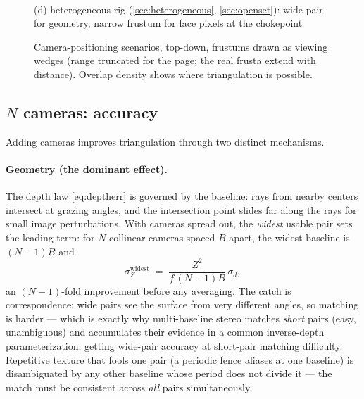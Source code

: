 \documentclass[11pt]{article}
\theoremstyle{definition}
\begin{document}
\begin{figure}[ht]
\begin{minipage}[t]{0.48\textwidth}
\\[2pt]
(d) heterogeneous rig (\autoref{sec:heterogeneous},
\autoref{sec:openset}): wide pair for geometry, narrow frustum for
face pixels at the chokepoint
\end{minipage}
\caption{Camera-positioning scenarios, top-down, frustums drawn as
viewing wedges (range truncated for the page; the real frusta extend
with distance). Overlap density shows where triangulation is possible.}
\label{fig:rigs}
\end{figure}

\subsection{$N$ cameras: accuracy}
\label{sec:ncams}

Adding cameras improves triangulation through two distinct mechanisms.

\paragraph{Geometry (the dominant effect).} The depth law
\eqref{eq:deptherr} is governed by the baseline: rays from nearby centers
intersect at grazing angles, and the intersection point slides far along
the rays for small image perturbations. With cameras spread out, the
\emph{widest} usable pair sets the leading term: for $N$ collinear cameras
spaced $B$ apart, the widest baseline is $(N{-}1)B$ and
\begin{equation}
\sigma_Z^{\text{widest}} \;=\; \frac{Z^2}{f\,(N{-}1)B}\,\sigma_d,
\label{eq:multibaseline}
\end{equation}
an $(N{-}1)$-fold improvement before any averaging. The catch is
correspondence: wide pairs see the surface from very different angles, so
matching is harder --- which is exactly why multi-baseline stereo
\cite{OkutomiKanade1993} matches \emph{short} pairs (easy, unambiguous) and
accumulates their evidence in a common inverse-depth parameterization,
getting wide-pair accuracy at short-pair matching difficulty. Repetitive
texture that fools one pair (a periodic fence aliases at one baseline) is
disambiguated by any other baseline whose period does not divide it --- the
match must be consistent across \emph{all} pairs simultaneously.
\end{document}
